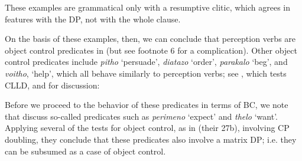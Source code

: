 \documentclass[output=paper]{langsci/langscibook}
\begin{document}
\ea%
    \label{ex:alexiadou:40}
    \z
\z  

These examples are grammatical only with a resumptive clitic, which agrees in features with the DP, not with the whole clause.{} 

On the basis of these examples, then, we can conclude that perception verbs are object control predicates in  (but see footnote 6 for a complication). Other object control predicates include \textit{pitho} ‘persuade’, \textit{diatazo} ‘order’, \textit{parakalo} ‘beg’, and \textit{voitho}, ‘help’, which all behave similarly to perception verbs; see , which tests CLLD, and \citet{Kotzoglou2002} for discussion:

    \z

Before we proceed to the behavior of these predicates in terms of BC, we note that \citet{Kotzoglou2007} discuss so-called  predicates such as \textit{perimeno} ‘expect’ and \textit{thelo} ‘want’. Applying several of the tests for object control, as in  (their 27b), involving CP doubling, they conclude that these predicates also involve a matrix DP; i.e. they can be subsumed as a case of object control. 
\end{document}
